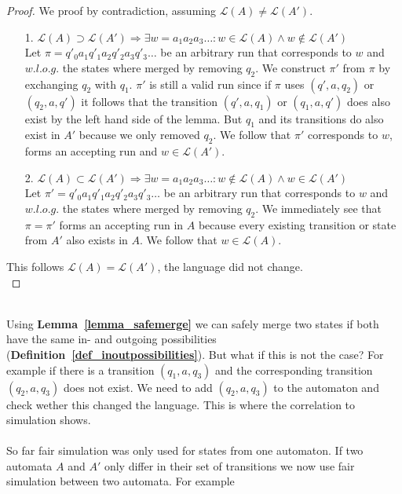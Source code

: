 \documentclass[12pt,oneside,bibliography=totoc,abstracton]{scrartcl}
\newcommand{\lemmaref}[1]{\textbf{Lemma~\ref{#1}}}
\newcommand{\defref}[1]{\textbf{Definition~\ref{#1}}}
\begin{document}
\begin{proof}
	We proof by contradiction, assuming $\mathcal{L}(A) \neq \mathcal{L}(A')$.
	\begin{itemize}
	\item[1.]
		$\mathcal{L}(A) \supset \mathcal{L}(A') \Rightarrow \exists w=a_1a_2a_3\ldots :
		w \in \mathcal{L}(A) \land w \notin \mathcal{L}(A')$\\
		Let $\pi = q'_0a_1q'_1a_2q'_2a_3q'_3\ldots$ be an arbitrary run that corresponds to $w$ and
		$w.l.o.g.$ the states where merged by removing $q_2$. We construct $\pi'$ from $\pi$
		by exchanging $q_2$ with $q_1$.
		$\pi'$ is still a valid run since if $\pi$ uses $(q', a, q_2)$ or $(q_2, a, q')$ it follows that the
		transition $(q', a, q_1)$ or $(q_1, a, q')$ does also exist by the left hand side of the lemma.
		But $q_1$ and its transitions do also exist in $A'$ because we only removed $q_2$.
		We follow that $\pi'$ corresponds to $w$, forms an accepting run and $w \in \mathcal{L}(A')$. \lightning
	\item[2.]
		$\mathcal{L}(A) \subset \mathcal{L}(A') \Rightarrow \exists w=a_1a_2a_3\ldots :
		w \notin \mathcal{L}(A) \land w \in \mathcal{L}(A')$\\
		Let $\pi' = q'_0a_1q'_1a_2q'_2a_3q'_3\ldots$ be an arbitrary run that corresponds to $w$ and
		$w.l.o.g.$ the states where merged by removing $q_2$. We immediately see that $\pi = \pi'$ forms an
		accepting run in $A$ because every existing transition or state from $A'$ also exists in $A$.
		We follow that $w \in \mathcal{L}(A)$. \lightning
	\end{itemize}
	This follows $\mathcal{L}(A) = \mathcal{L}(A')$, the language did not change.\\
\end{proof}\quad\\
Using \lemmaref{lemma_safemerge} we can safely merge two states if both have the same in- and outgoing
possibilities (\defref{def_inoutpossibilities}).
But what if this is not the case? For example if there is a transition $(q_1, a, q_3)$ and the corresponding transition
$(q_2, a, q_3)$ does not exist.
We need to add $(q_2, a, q_3)$ to the automaton and check wether this changed the language.
This is where the correlation to simulation shows.\\\\
So far fair simulation was only used for states from one automaton. If two automata $A$ and $A'$ only
differ in their set of transitions we now use fair simulation between two automata. For example
\end{document}
